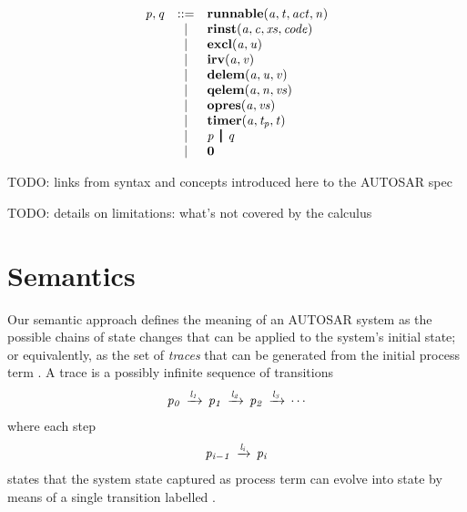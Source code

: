 \documentclass[twocolumn]{article}
\begin{document}
\[
\begin{array}{rcll}
  \V{P},\V{Q}   
  		& ::= & \Trunnable{\V{A}}{\V{T}}{\Act}{\V{N}}    \\
        & |   & \Trinst{\V{A}}{\V{C}}{\Xs}{\Code}       \\
        & |   & \Texcl{\V{A}}{\V{U}}                    \\
        & |   & \Tirv{\V{A}}{\V{V}}                     \\
        & |   & \Tdelem{\V{A}}{\V{U}}{\V{V}}            \\
        & |   & \Tqelem{\V{A}}{\V{N}}{\Vs}              \\
        & |   & \Topres{\V{A}}{\Vs}                     \\
        & |   & \Ttimer{\V{A}}{\V{T_p}}{\V{T}}          \\
        & |   & \Tpar{\V{P}}{\V{Q}}                     \\
        & |	  & \Tzero									\\
\end{array}
\]

TODO: links from syntax and concepts introduced here to the AUTOSAR spec

TODO: details on limitations: what's not covered by the calculus


\section{Semantics}
\label{sec:Sem}

Our semantic approach defines the meaning of an AUTOSAR system as the possible chains of state changes that can be applied to the system's initial state; or equivalently, as the set of \emph{traces} that can be generated from the initial process term . A trace is a possibly infinite sequence of transitions
\[
\begin{array}{c}
  \V{P_0} \red{\V{L_1}} \V{P_1} \red{\V{L_2}} \V{P_2} \red{\V{L_3}} \cdots
\end{array}
\]
where each step
\[
\begin{array}{c}
  \V{P_{i-1}} \red{\V{L_i}} \V{P_i}
\end{array}
\]
states that the system state captured as process term  can evolve into state  by means of a single transition labelled .
\end{document}

